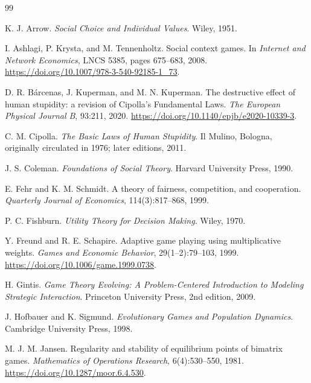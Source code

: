 \documentclass[a4paper,fleqn]{cas-dc}
\theoremstyle{remark}
\begin{document}
\begin{thebibliography}{99}

K. J. Arrow.
\emph{Social Choice and Individual Values}.
Wiley, 1951.

I. Ashlagi, P. Krysta, and M. Tennenholtz.
Social context games.
In \emph{Internet and Network Economics}, LNCS 5385, pages 675--683, 2008.
\url{https://doi.org/10.1007/978-3-540-92185-1_73}.

D. R. B\'{a}rcenas, J. Kuperman, and M. N. Kuperman.
The destructive effect of human stupidity: a revision of Cipolla's Fundamental Laws.
\emph{The European Physical Journal B}, 93:211, 2020.
\url{https://doi.org/10.1140/epjb/e2020-10339-3}.

C. M. Cipolla.
\emph{The Basic Laws of Human Stupidity}.
Il Mulino, Bologna, originally circulated in 1976; later editions, 2011.

J. S. Coleman.
\emph{Foundations of Social Theory}.
Harvard University Press, 1990.

E. Fehr and K. M. Schmidt.
A theory of fairness, competition, and cooperation.
\emph{Quarterly Journal of Economics}, 114(3):817--868, 1999.

P. C. Fishburn.
\emph{Utility Theory for Decision Making}.
Wiley, 1970.

Y. Freund and R. E. Schapire.
Adaptive game playing using multiplicative weights.
\emph{Games and Economic Behavior}, 29(1--2):79--103, 1999.
\url{https://doi.org/10.1006/game.1999.0738}.

H. Gintis.
\emph{Game Theory Evolving: A Problem-Centered Introduction to Modeling Strategic Interaction}.
Princeton University Press, 2nd edition, 2009.

J. Hofbauer and K. Sigmund.
\emph{Evolutionary Games and Population Dynamics}.
Cambridge University Press, 1998.

M. J. M. Jansen.
Regularity and stability of equilibrium points of bimatrix games.
\emph{Mathematics of Operations Research}, 6(4):530--550, 1981.
\url{https://doi.org/10.1287/moor.6.4.530}.


\end{thebibliography}
\end{document}
